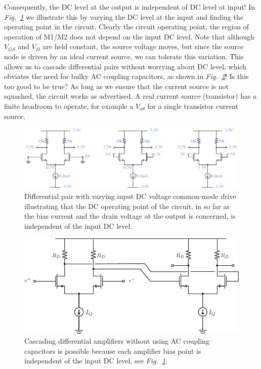 Consequently, the DC level at the output is independent of DC level at input! In \emph{Fig.~\ref{fig:diff_amp_bias_cm}} we illustrate this by varying the DC level at the input and finding the operating point in the circuit.  Clearly the circuit operating point, the region of operation of M1/M2 does not depend on the input DC level.  Note that although $V_{GS}$ and $V_{D}$ are held constant, the source voltage moves, but since the source node is driven by an ideal current source, we can tolerate this variation.  This allows us to cascade differential pairs without worrying about DC level, which obviates the need for bulky AC coupling capacitors, as shown in \emph{Fig.~\ref{fig:diff_amp_cascade}}! Is this too good to be true?  As long as we ensure that the current source is not squashed, the circuit works as advertised.  A real current source (transistor) has a finite headroom to operate, for example a $V_{od}$ for a single transistor current source.
\begin{figure}[H]
\centering
\includegraphics[width=\columnwidth]{diff_amp_bias_cm.pdf}
\caption{Differential pair with varying input DC voltage common-mode drive illustrating that the DC operating point of the circuit, in so far as the bias current and the drain voltage at the output is concerned, is independent of the input DC level.}
\label{fig:diff_amp_bias_cm}
\end{figure}
\newpage
\begin{figure}[t]
\centering
\includegraphics[scale=.8]{Diff_Cascade.pdf}
\caption{Cascading differential amplifiers without using AC coupling capacitors is possible because each amplifier bias point is independent of the input DC level, see \emph{Fig.~\ref{fig:diff_amp_bias_cm}}.}
\label{fig:diff_amp_cascade}
\end{figure}

